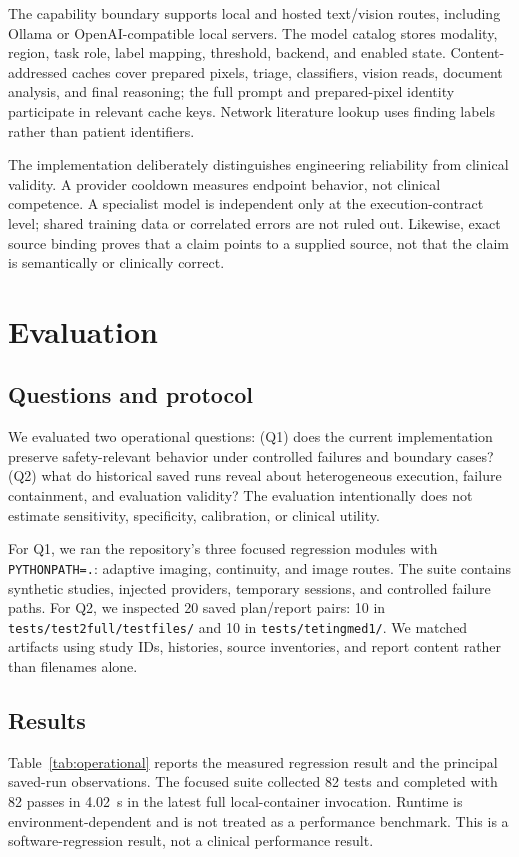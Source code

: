 \documentclass[a4paper,conference]{IEEEtran}
\begin{document}
The capability boundary supports local and hosted text/vision routes, including Ollama or OpenAI-compatible local servers. The model catalog stores modality, region, task role, label mapping, threshold, backend, and enabled state. Content-addressed caches cover prepared pixels, triage, classifiers, vision reads, document analysis, and final reasoning; the full prompt and prepared-pixel identity participate in relevant cache keys. Network literature lookup uses finding labels rather than patient identifiers.

The implementation deliberately distinguishes engineering reliability from clinical validity. A provider cooldown measures endpoint behavior, not clinical competence. A specialist model is independent only at the execution-contract level; shared training data or correlated errors are not ruled out. Likewise, exact source binding proves that a claim points to a supplied source, not that the claim is semantically or clinically correct.

\section{Evaluation}
\subsection{Questions and protocol}
We evaluated two operational questions: (Q1) does the current implementation preserve safety-relevant behavior under controlled failures and boundary cases? (Q2) what do historical saved runs reveal about heterogeneous execution, failure containment, and evaluation validity? The evaluation intentionally does not estimate sensitivity, specificity, calibration, or clinical utility.

For Q1, we ran the repository's three focused regression modules with \texttt{PYTHONPATH=.}: adaptive imaging, continuity, and image routes. The suite contains synthetic studies, injected providers, temporary sessions, and controlled failure paths. For Q2, we inspected 20 saved plan/report pairs: 10 in \texttt{tests/test2full/testfiles/} and 10 in \texttt{tests/tetingmed1/}. We matched artifacts using study IDs, histories, source inventories, and report content rather than filenames alone.

\subsection{Results}
Table~\ref{tab:operational} reports the measured regression result and the principal saved-run observations. The focused suite collected 82 tests and completed with 82 passes in 4.02~s in the latest full local-container invocation. Runtime is environment-dependent and is not treated as a performance benchmark. This is a software-regression result, not a clinical performance result.
\end{document}
